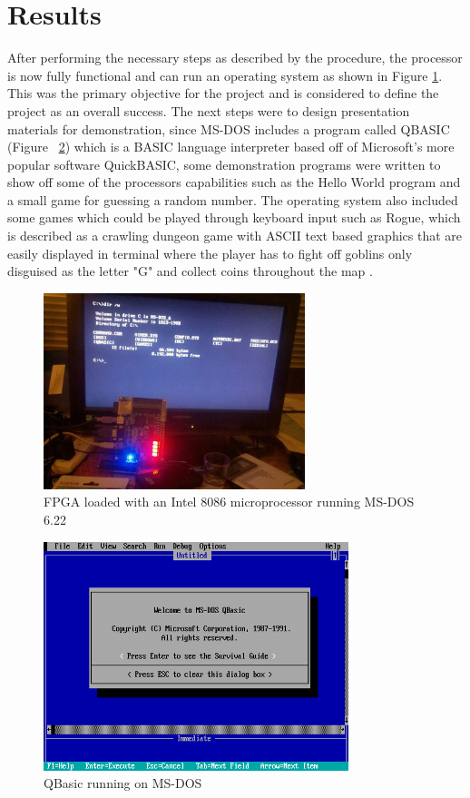 \documentclass[pdftex,10.5pt]{report}
\begin{document}
\newpage

\section{Results}
After performing the necessary steps as described by the procedure, the processor is now fully functional and can run an operating system as shown in Figure \ref{fig:WorkingFPGA}. This was the primary objective for the project and is considered to define the project as an overall success. The next steps were to design presentation materials for demonstration, since MS-DOS includes a program called QBASIC (Figure ~\ref{fig:qbasic}) which is a BASIC language interpreter based off of Microsoft's more popular software QuickBASIC, some demonstration programs were written to show off some of the processors capabilities such as the Hello World program and a small game for guessing a random number. The operating system also included some games which could be played through keyboard input such as Rogue, which is described as a crawling dungeon game with ASCII text based graphics that are easily displayed in terminal where the player has to fight off goblins only disguised as the letter "G" and collect coins throughout the map \cite{Rogue}. 

\begin{figure}[!h]
	\centering
	\includegraphics[width=3in]{figures/fpgaworking.jpg}
	\caption{FPGA loaded with an Intel 8086 microprocessor running MS-DOS 6.22}
	\label{fig:WorkingFPGA}
\end{figure}

\begin{figure}[!h]
	\centering
	\includegraphics[width=3.5in]{figures/qbasic}
	\caption{QBasic running on MS-DOS}
	\label{fig:qbasic}
\end{figure}
\end{document}
